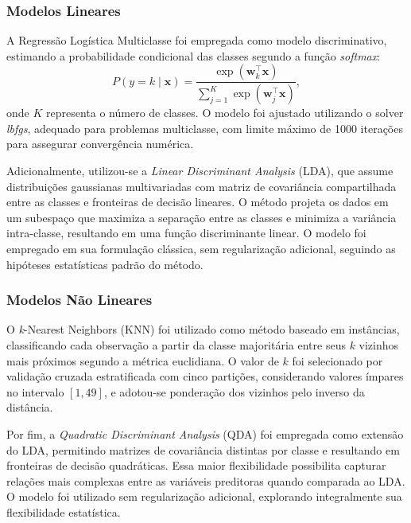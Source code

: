 \subsubsection{Modelos Lineares}
\label{subsubsec:modelos_lineares}

A Regressão Logística Multiclasse foi empregada como modelo discriminativo, estimando a probabilidade condicional das classes segundo a função \textit{softmax}:
\begin{equation}
P(y=k \mid \mathbf{x}) =
\frac{\exp(\mathbf{w}_{k}^{\top}\mathbf{x})}
{\sum_{j=1}^{K} \exp(\mathbf{w}_{j}^{\top}\mathbf{x})},
\end{equation}
onde $K$ representa o número de classes. O modelo foi ajustado utilizando o solver \textit{lbfgs}, adequado para problemas multiclasse, com limite máximo de 1000 iterações para assegurar convergência numérica.

Adicionalmente, utilizou-se a \textit{Linear Discriminant Analysis} (LDA), que assume distribuições gaussianas multivariadas com matriz de covariância compartilhada entre as classes e fronteiras de decisão lineares. O método projeta os dados em um subespaço que maximiza a separação entre as classes e minimiza a variância intra-classe, resultando em uma função discriminante linear. O modelo foi empregado em sua formulação clássica, sem regularização adicional, seguindo as hipóteses estatísticas padrão do método.

\subsubsection{Modelos Não Lineares}
\label{subsubsec:modelos_nao_lineares}

O \textit{k}-Nearest Neighbors (KNN) foi utilizado como método baseado em instâncias, classificando cada observação a partir da classe majoritária entre seus $k$ vizinhos mais próximos segundo a métrica euclidiana. O valor de $k$ foi selecionado por validação cruzada estratificada com cinco partições, considerando valores ímpares no intervalo $[1,49]$, e adotou-se ponderação dos vizinhos pelo inverso da distância.


Por fim, a \textit{Quadratic Discriminant Analysis} (QDA) foi empregada como extensão do LDA, permitindo matrizes de covariância distintas por classe e resultando em fronteiras de decisão quadráticas. Essa maior flexibilidade possibilita capturar relações mais complexas entre as variáveis preditoras quando comparada ao LDA. O modelo foi utilizado sem regularização adicional, explorando integralmente sua flexibilidade estatística.

